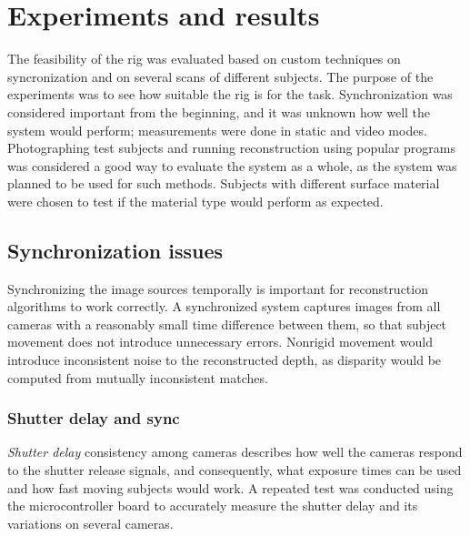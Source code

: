 \section{Experiments and results} \label{sec:experiments}

The feasibility of the rig was evaluated based on custom techniques on syncronization and on several scans of different subjects.
The purpose of the experiments was to see how suitable the rig is for the task.
Synchronization was considered important from the beginning, and it was unknown how well the system would perform; measurements were done in static and video modes.
Photographing test subjects and running reconstruction using popular programs was considered a good way to evaluate the system as a whole, as the system was planned to be used for such methods.
Subjects with different surface material were chosen to test if the material type would perform as expected.

\subsection{Synchronization issues}

Synchronizing the image sources temporally is important for reconstruction algorithms to work correctly.
A synchronized system captures images from all cameras with a reasonably small time difference between them, so that subject movement does not introduce unnecessary errors.
Nonrigid movement would introduce inconsistent noise to the reconstructed depth, as disparity would be computed from mutually inconsistent matches.

\subsubsection{Shutter delay and sync} \label{sec:shutterdelaymeas}

\emph{Shutter delay} consistency among cameras describes how well the cameras respond to the shutter release signals, and consequently, what exposure times can be used and how fast moving subjects would work.
A repeated test was conducted using the microcontroller board to accurately measure the shutter delay and its variations on several cameras.

